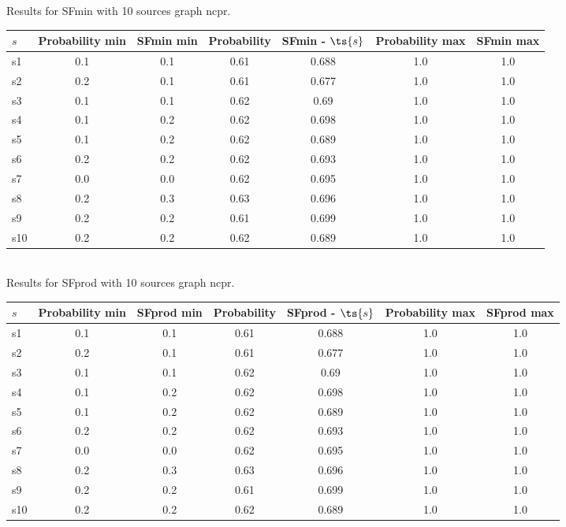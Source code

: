 \documentclass{article}
\begin{document}
\noindent Results for SFmin with 10 sources graph ncpr.

\noindent\begin{tabular}{|l|c|c|c|c|c|c|}
\hline
$s$& Probability min & SFmin min & Probability & SFmin - $\ts{s}$ & Probability max & SFmin max\\
\hline
s1 &0.1 & 0.1 & 0.61 & 0.688 & 1.0 & 1.0\\
\hline
s2 &0.2 & 0.1 & 0.61 & 0.677 & 1.0 & 1.0\\
\hline
s3 &0.1 & 0.1 & 0.62 & 0.69 & 1.0 & 1.0\\
\hline
s4 &0.1 & 0.2 & 0.62 & 0.698 & 1.0 & 1.0\\
\hline
s5 &0.1 & 0.2 & 0.62 & 0.689 & 1.0 & 1.0\\
\hline
s6 &0.2 & 0.2 & 0.62 & 0.693 & 1.0 & 1.0\\
\hline
s7 &0.0 & 0.0 & 0.62 & 0.695 & 1.0 & 1.0\\
\hline
s8 &0.2 & 0.3 & 0.63 & 0.696 & 1.0 & 1.0\\
\hline
s9 &0.2 & 0.2 & 0.61 & 0.699 & 1.0 & 1.0\\
\hline
s10 &0.2 & 0.2 & 0.62 & 0.689 & 1.0 & 1.0\\
\hline
\end{tabular}\\

\noindent Results for SFprod with 10 sources graph ncpr.

\noindent\begin{tabular}{|l|c|c|c|c|c|c|}
\hline
$s$& Probability min & SFprod min & Probability & SFprod - $\ts{s}$ & Probability max & SFprod max\\
\hline
s1 &0.1 & 0.1 & 0.61 & 0.688 & 1.0 & 1.0\\
\hline
s2 &0.2 & 0.1 & 0.61 & 0.677 & 1.0 & 1.0\\
\hline
s3 &0.1 & 0.1 & 0.62 & 0.69 & 1.0 & 1.0\\
\hline
s4 &0.1 & 0.2 & 0.62 & 0.698 & 1.0 & 1.0\\
\hline
s5 &0.1 & 0.2 & 0.62 & 0.689 & 1.0 & 1.0\\
\hline
s6 &0.2 & 0.2 & 0.62 & 0.693 & 1.0 & 1.0\\
\hline
s7 &0.0 & 0.0 & 0.62 & 0.695 & 1.0 & 1.0\\
\hline
s8 &0.2 & 0.3 & 0.63 & 0.696 & 1.0 & 1.0\\
\hline
s9 &0.2 & 0.2 & 0.61 & 0.699 & 1.0 & 1.0\\
\hline
s10 &0.2 & 0.2 & 0.62 & 0.689 & 1.0 & 1.0\\
\hline
\end{tabular}\\
\end{document}
